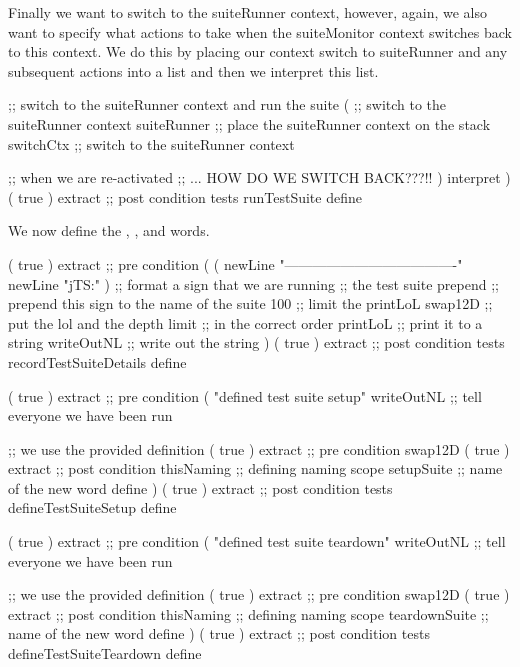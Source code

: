 Finally we want to switch to the suiteRunner context, however, again, we 
also want to specify what actions to take when the suiteMonitor context 
switches back to this context. We do this by placing our context switch to 
suiteRunner and any subsequent actions into a list and then we interpret 
this list. 

\startJoylolCode
  ;; switch to the suiteRunner context and run the suite
  (
    ;; switch to the suiteRunner context
    suiteRunner ;; place the suiteRunner context on the stack
    switchCtx   ;; switch to the suiteRunner context
    
    ;; when we are re-activated
    ;; ... HOW DO WE SWITCH BACK???!!
  )
  interpret
)
( { true } ) extract ;; post condition
tests
runTestSuite
define
\stopJoylolCode

We now define the , 
, and  words. 

\startJoylolCode
( { true } ) extract ;; pre condition
(
  (
    newLine
    "-------------------------------------"
    newLine
    "jTS:"
  )           ;; format a sign that we are running
              ;; the test suite
  prepend     ;; prepend this sign to the name of the suite
  100         ;; limit the printLoL
  swap12D     ;; put the lol and the depth limit 
              ;; in the correct order
  printLoL    ;; print it to a string
  writeOutNL  ;; write out the string
)
( { true } ) extract ;; post condition
tests
recordTestSuiteDetails
define
\stopJoylolCode

\startJoylolCode
( { true } ) extract ;; pre condition
(
  "defined test suite setup"
  writeOutNL  ;; tell everyone we have been run

              ;; we use the provided definition
  ( { true } ) extract ;; pre condition
  swap12D
  ( { true } ) extract ;; post condition
  thisNaming  ;; defining naming scope
  setupSuite  ;; name of the new word
  define
)
( { true } ) extract ;; post condition
tests
defineTestSuiteSetup
define
\stopJoylolCode

\startJoylolCode
( { true } ) extract ;; pre condition
(
  "defined test suite teardown"
  writeOutNL    ;; tell everyone we have been run

                ;; we use the provided definition
  ( { true } ) extract ;; pre condition
  swap12D
  ( { true } ) extract ;; post condition
  thisNaming    ;; defining naming scope
  teardownSuite ;; name of the new word
  define
)
( { true } ) extract ;; post condition
tests
defineTestSuiteTeardown
define
\stopJoylolCode

